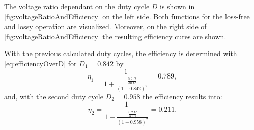 \begin{solutionblock}
The voltage ratio dependant on the duty cycle $D$ is shown in \autoref{fig:voltageRatioAndEfficiency} on the left side. Both functions for the loss-free and lossy operation are visualized. Moreover, on the right side of \autoref{fig:voltageRatioAndEfficiency} the resulting efficiency cures are shown.

    

\end{solutionblock}



\begin{solutionblock}
    With the previous calculated duty cycles, the efficiency is determined with \eqref{eq:efficiencyOverD} for $D_{\mathrm{1}} = 0.842$ by
    \begin{equation}
        \eta_{\mathrm{1}} = \frac{1}{1+\frac{\frac{\SI{0.2}{\Omega}}{\SI{30}{\Omega}}}{\left(1-0.842\right)^2}} = 0.789,
    \end{equation}
    and, with the second duty cycle $D_2 = 0.958$ the efficiency results into:
    \begin{equation}
        \eta_{\mathrm{2}} = \frac{1}{1+\frac{\frac{\SI{0.2}{\Omega}}{\SI{30}{\Omega}}}{\left(1-0.958\right)^2}} = 0.211.
    \end{equation}

\end{solutionblock}




